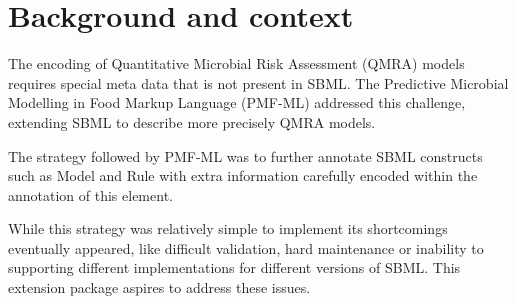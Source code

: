 \section{Background and context}
\label{Background}

The encoding of Quantitative Microbial Risk Assessment (QMRA) models requires
special meta data that is not present in SBML. The Predictive Microbial
Modelling in Food Markup Language (PMF-ML) addressed this challenge, extending
SBML to describe more precisely QMRA models.

The strategy followed by PMF-ML was to further annotate SBML constructs such as
Model and Rule with extra information carefully encoded within the annotation of
this element.

While this strategy was relatively simple to implement its shortcomings
eventually appeared, like difficult validation, hard maintenance or inability to
supporting different implementations for different versions of SBML. This
extension package aspires to address these issues.

